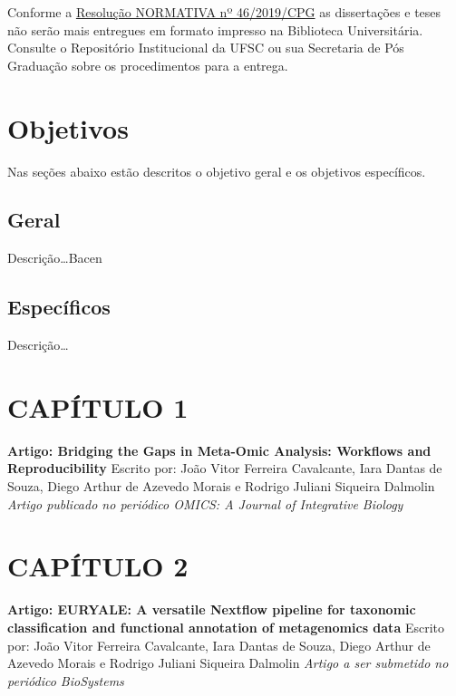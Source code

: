 \documentclass[
	12pt,				%
	oneside,			%
	a4paper,			%
	chapter=TITLE,		%
	section=TITLE,		%
	english,			%
	brazil				%
	]{abntex2}
\begin{document}
Conforme a \href{https://repositorio.ufsc.br/bitstream/handle/123456789/197121/RN46.2019.pdf?sequence=1&isAllowed=y}{Resolução NORMATIVA nº 46/2019/CPG}
as dissertações e teses não serão mais entregues em formato impresso na
Biblioteca Universitária. Consulte o Repositório Institucional da UFSC ou sua
Secretaria de Pós Graduação sobre os procedimentos para a entrega.

\chapter{Objetivos}\label{obj}

Nas seções abaixo estão descritos o objetivo geral e os objetivos
específicos.

\section{Geral}\label{geral}

Descrição\ldots{}\gls{Bacen}

\section{Específicos}\label{especuxedficos}

Descrição\ldots{}

\chapter*{CAPÍTULO 1}\label{cap1}
\begin{center}
\textbf{Artigo: Bridging the Gaps in Meta-Omic Analysis: Workflows and Reproducibility}
\bigskip\newline
Escrito por: João Vitor Ferreira Cavalcante, Iara Dantas de Souza, Diego Arthur de Azevedo Morais e Rodrigo Juliani Siqueira Dalmolin
\bigskip\newline
\textit{Artigo publicado no periódico OMICS: A Journal of Integrative Biology}

\end{center}
\begin{fichacatalografica}
    
\end{fichacatalografica}
\chapter*{CAPÍTULO 2}\label{cap2}
\begin{center}
\textbf{Artigo: EURYALE: A versatile Nextflow pipeline for taxonomic classification and functional annotation of metagenomics data}
\bigskip\newline
Escrito por: João Vitor Ferreira Cavalcante, Iara Dantas de Souza, Diego Arthur de Azevedo Morais e Rodrigo Juliani Siqueira Dalmolin
\bigskip\newline
\textit{Artigo a ser submetido no periódico BioSystems}

\end{center}
\begin{fichacatalografica}
    
\end{fichacatalografica}
\end{document}
